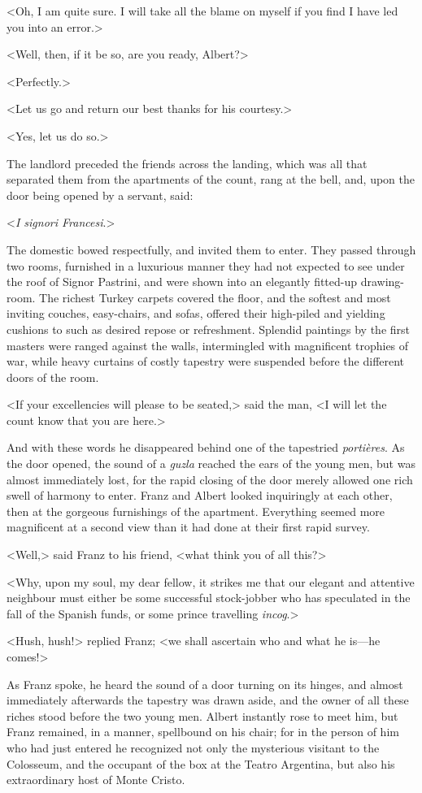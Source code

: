 <Oh, I am quite sure. I will take all the blame on myself if you find I have led you into an error.> 

 <Well, then, if it be so, are you ready, Albert?> 

 <Perfectly.> 

 <Let us go and return our best thanks for his courtesy.> 

 <Yes, let us do so.> 

 The landlord preceded the friends across the landing, which was all that separated them from the apartments of the count, rang at the bell, and, upon the door being opened by a servant, said: 

 <\textit{I signori Francesi}.> 

 The domestic bowed respectfully, and invited them to enter. They passed through two rooms, furnished in a luxurious manner they had not expected to see under the roof of Signor Pastrini, and were shown into an elegantly fitted-up drawing-room. The richest Turkey carpets covered the floor, and the softest and most inviting couches, easy-chairs, and sofas, offered their high-piled and yielding cushions to such as desired repose or refreshment. Splendid paintings by the first masters were ranged against the walls, intermingled with magnificent trophies of war, while heavy curtains of costly tapestry were suspended before the different doors of the room. 

 <If your excellencies will please to be seated,> said the man, <I will let the count know that you are here.> 

 And with these words he disappeared behind one of the tapestried \textit{portières}. As the door opened, the sound of a \textit{guzla} reached the ears of the young men, but was almost immediately lost, for the rapid closing of the door merely allowed one rich swell of harmony to enter. Franz and Albert looked inquiringly at each other, then at the gorgeous furnishings of the apartment. Everything seemed more magnificent at a second view than it had done at their first rapid survey. 

 <Well,> said Franz to his friend, <what think you of all this?> 

 <Why, upon my soul, my dear fellow, it strikes me that our elegant and attentive neighbour must either be some successful stock-jobber who has speculated in the fall of the Spanish funds, or some prince travelling \textit{incog}.> 

 <Hush, hush!> replied Franz; <we shall ascertain who and what he is—he comes!> 

 As Franz spoke, he heard the sound of a door turning on its hinges, and almost immediately afterwards the tapestry was drawn aside, and the owner of all these riches stood before the two young men. Albert instantly rose to meet him, but Franz remained, in a manner, spellbound on his chair; for in the person of him who had just entered he recognized not only the mysterious visitant to the Colosseum, and the occupant of the box at the Teatro Argentina, but also his extraordinary host of Monte Cristo.